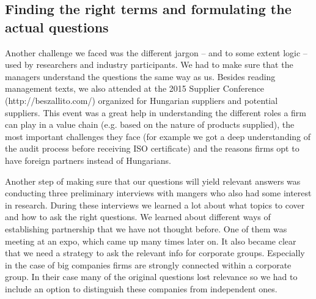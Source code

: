 \usepackage{}\documentclass[final, dvipsnames, authoryear,12pt]{elsarticle}
\begin{document}
\subsection{Finding the right terms and formulating the actual questions}
\label{sec:terms}

Another challenge we faced was the different jargon -- and to some extent logic -- used by researchers and industry participants. We had to make sure that the managers understand the questions the same way as us. Besides reading management texts, we also attended at the 2015 Supplier Conference (http://beszallito.com/) organized for Hungarian suppliers and potential suppliers. This event was a great help in understanding the different roles a firm can play in a value chain (e.g. based on the nature of products supplied), the most important challenges they face (for example we got a deep understanding of the audit process before receiving ISO certificate) and the reasons firms opt to have foreign partners instead of Hungarians.

Another step of making sure that our questions will yield relevant answers was conducting three preliminary interviews with mangers who also had some interest in research. During these interviews we learned a lot about what topics to cover and how to ask the right questions. We learned about different ways of establishing partnership that we have not thought before. One of them was meeting at an expo, which came up many times later on. It also became clear that we need a strategy to ask the relevant info for corporate groups. Especially in the case of big companies firms are strongly connected within a corporate group. In their case many of the original questions lost relevance so we had to include an option to distinguish these companies from independent ones.


\end{document}
